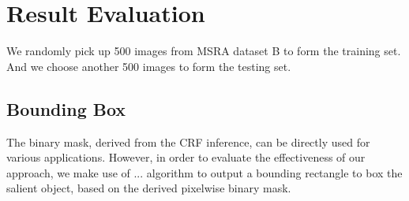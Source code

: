 \documentclass[10pt,twocolumn,letterpaper]{article}
\begin{document}
\section{Result Evaluation}
We randomly pick up 500 images from MSRA dataset B to form the training set. And we choose another 500 images
to form the testing set.
\subsection{Bounding Box}
The binary mask, derived from the CRF inference, can be directly used for various applications. 
However, in order to evaluate the effectiveness of our approach, we make use of ... algorithm to output a bounding 
rectangle to box the salient object, based on the derived pixelwise binary mask. 

\end{document}
